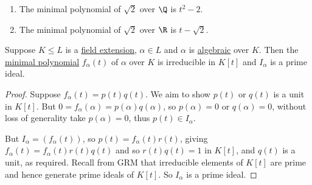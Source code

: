 \documentclass{article}
\begin{document}
\begin{eg}\leavevmode
    \begin{enumerate}[label=(\roman*)]
        \item The minimal polynomial of $\sqrt{2}$ over $\Q$ is $t^2 - 2$.
        \item The minimal polynomial of $\sqrt{2}$ over $\R$ is $t - \sqrt{2}$.
    \end{enumerate}
\end{eg}

\begin{nlemma}\label{lem:1.7}
    Suppose $K \leq L$ is a \hyperlink{def:fieldExt}{field extension}, $\alpha \in L$ and $\alpha$ is \hyperlink{def:algebraic}{algebraic} over $K$.
    Then the \hyperlink{def:minimalPoly}{minimal polynomial} $f_\alpha(t)$ of $\alpha$ over $K$ is irreducible in $K[t]$ and $I_\alpha$ is a prime ideal.
\end{nlemma}

\begin{proof}
    Suppose $f_\alpha(t) = p(t) q(t)$. We aim to show $p(t)$ or $q(t)$ is a unit in $K[t]$.
    But $0 = f_\alpha(\alpha) = p(\alpha) q(\alpha)$, so $p(\alpha) = 0$ or $q(\alpha) = 0$, without loss of generality take $p(\alpha) = 0$, thus $p(t) \in I_\alpha$.

    But $I_\alpha=(f_\alpha(t))$, so $p(t) = f_\alpha(t) r(t)$, giving $f_\alpha(t) = f_\alpha(t) r(t) q(t)$ and so $r(t) q(t) = 1$ in $K[t]$, and $q(t)$ is a unit, as required.
    Recall from GRM that irreducible elements of $K[t]$ are prime and hence generate prime ideals of $K[t]$. So $I_\alpha$ is a prime ideal.
\end{proof}

\end{document}
